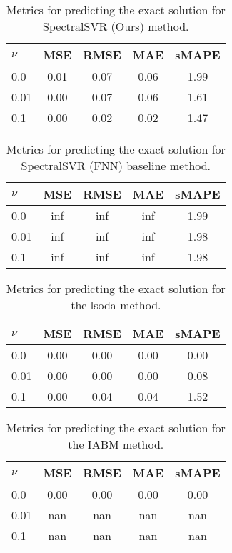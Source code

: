 \begin{table}[H]
  \caption{Metrics for predicting the exact solution for SpectralSVR (Ours) method.}\label{table:comparison_exact_metrics_lssvr}
  \centering
  \begin{tabular}{lcccc}
    \toprule
    \(\nu \) & MSE  & RMSE & MAE  & sMAPE \\
    \midrule
    0.0      & 0.01 & 0.07 & 0.06 & 1.99  \\
    0.01     & 0.00 & 0.07 & 0.06 & 1.61  \\
    0.1      & 0.00 & 0.02 & 0.02 & 1.47  \\
    \bottomrule
  \end{tabular}
\end{table}
\begin{table}[H]
  \caption{Metrics for predicting the exact solution for SpectralSVR (FNN) baseline method.}\label{table:comparison_exact_metrics_fnn}
  \centering
  \begin{tabular}{lcccc}
    \toprule
    \(\nu \) & MSE & RMSE & MAE & sMAPE \\
    \midrule
    0.0      & inf & inf  & inf & 1.99  \\
    0.01     & inf & inf  & inf & 1.98  \\
    0.1      & inf & inf  & inf & 1.98  \\
    \bottomrule
  \end{tabular}
\end{table}
\begin{table}[H]
  \caption{Metrics for predicting the exact solution for the lsoda method.}\label{table:comparison_exact_metrics_lsoda}
  \centering
  \begin{tabular}{lcccc}
    \toprule
    \(\nu \) & MSE  & RMSE & MAE  & sMAPE \\
    \midrule
    0.0      & 0.00 & 0.00 & 0.00 & 0.00  \\
    0.01     & 0.00 & 0.00 & 0.00 & 0.08  \\
    0.1      & 0.00 & 0.04 & 0.04 & 1.52  \\
    \bottomrule
  \end{tabular}
\end{table}
\begin{table}[H]
  \caption{Metrics for predicting the exact solution for the IABM method.}\label{table:comparison_exact_metrics_iabm}
  \centering
  \begin{tabular}{lcccc}
    \toprule
    \(\nu \) & MSE  & RMSE & MAE  & sMAPE \\
    \midrule
    0.0      & 0.00 & 0.00 & 0.00 & 0.00  \\
    0.01     & nan  & nan  & nan  & nan   \\
    0.1      & nan  & nan  & nan  & nan   \\
    \bottomrule
  \end{tabular}
\end{table}